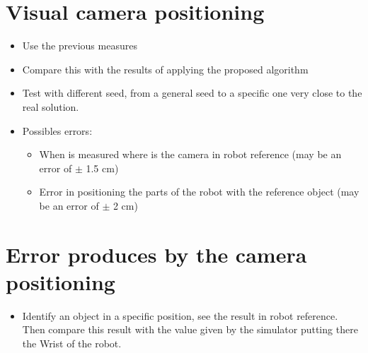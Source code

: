 \documentclass[12pt,a4paper,final,twoside,openright]{report}
\begin{document}
\section{Visual camera positioning}
\begin{itemize}
\item Use the previous measures
\item Compare this with the results of applying the proposed algorithm 
\item Test with different seed, from a general seed to a specific one very close to the real solution.
\item Possibles errors:
\begin{itemize}
\item When is measured where is the camera in robot reference (may be an error of $\pm$ 1.5 cm)
\item Error in positioning the parts of the robot with the reference object (may be an error of $\pm$ 2 cm)
\end{itemize}
\end{itemize}

\section{Error produces by the camera positioning}
\begin{itemize}
\item Identify an object in a specific position, see the result in robot reference. Then compare this result with the value given by the simulator putting there the Wrist of the robot.
\end{itemize}
\end{document}
